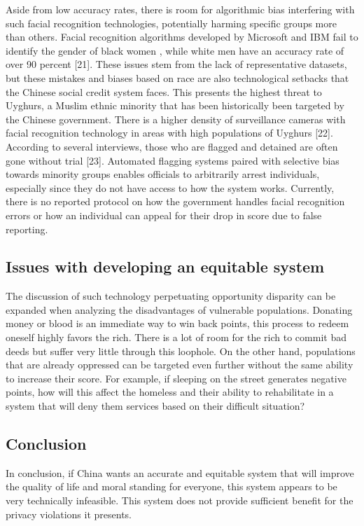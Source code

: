 \documentclass[letterpaper, 10 pt, conference]{ieeeconf}  %
\begin{document}
Aside from low accuracy rates, there is room for algorithmic bias interfering with such facial recognition technologies, potentially harming specific groups more than others. Facial recognition algorithms developed by Microsoft and IBM fail to identify the gender of black women , while white men have an accuracy rate of over 90 percent [21]. These issues stem from the lack of representative datasets, but these mistakes and biases based on race are also technological setbacks that the Chinese social credit system faces. This presents the highest threat to Uyghurs, a Muslim ethnic minority that has been historically been targeted by the Chinese government. There is a higher density of surveillance cameras with facial recognition technology in areas with high populations of Uyghurs [22]. According to several interviews, those who are flagged and detained are often gone without trial [23]. Automated flagging systems paired with selective bias towards minority groups enables officials to arbitrarily arrest individuals, especially since they do not have access to how the system works. Currently, there is no reported protocol on how the government handles facial recognition errors or how an individual can appeal for their drop in score due to false reporting.
\subsection{Issues with developing an equitable system}

The discussion of such technology perpetuating opportunity disparity can be expanded when analyzing the disadvantages of vulnerable populations. Donating money or blood is an immediate way to win back points, this process to redeem oneself highly favors the rich. There is a lot of room for the rich to commit bad deeds but suffer very little through this loophole. On the other hand, populations that are already oppressed can be targeted even further without the same ability to increase their score. For example, if sleeping on the street generates negative points, how will this affect the homeless and their ability to rehabilitate in a system that will deny them services based on their difficult situation?
\subsection{Conclusion}

In conclusion, if China wants an accurate  and equitable system that will improve the quality of life and moral standing for everyone, this system appears to be very technically infeasible. This system does not provide sufficient benefit for the privacy violations it presents.
\end{document}
